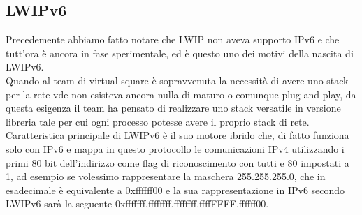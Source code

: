 \subsection{LWIPv6}
Precedemente abbiamo fatto notare che LWIP non aveva supporto IPv6 e che tutt'ora \`e ancora in fase sperimentale, ed è questo uno dei motivi della nascita di LWIPv6.\\
Quando al team di virtual square \`e sopravvenuta la necessit\`a di avere uno stack per la rete vde non esisteva ancora nulla di maturo o comunque plug and play, da questa esigenza il team ha pensato di realizzare uno stack versatile in versione libreria tale per cui ogni processo potesse avere il proprio stack di rete.\\
Caratteristica principale di LWIPv6 \`e il suo motore ibrido che, di fatto funziona solo con IPv6 e mappa in questo protocollo le comunicazioni IPv4 utilizzando i primi 80 bit dell'indirizzo come flag di riconoscimento con tutti e 80 impostati a 1, ad esempio se volessimo rappresentare la maschera 255.255.255.0, che in esadecimale \`e equivalente a 0xffffff00 e la sua rappresentazione in IPv6 secondo LWIPv6 sar\`a la seguente 0xfffffff.ffffffff.ffffffff.ffffFFFF.ffffff00.
